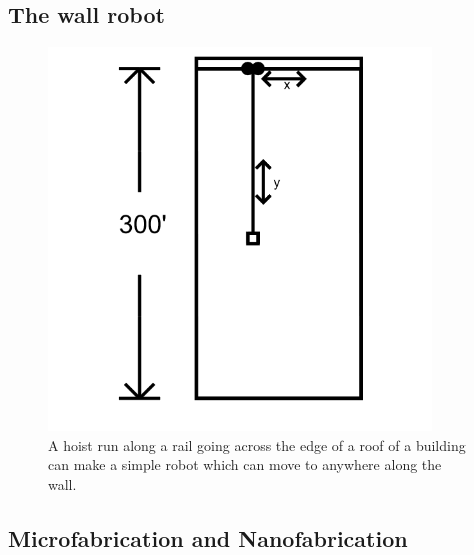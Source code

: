 \subsection{The wall robot}


\begin{figure}
	\centering
	\includegraphics[width=4in]{figures/machines/buildingwallrobot.png}
	\caption[buildingwallrobot]
	{A hoist run along a rail going across the edge of a roof of a building can make a simple robot which can move to anywhere along the wall.}
\end{figure}


\subsection{Microfabrication and Nanofabrication}

